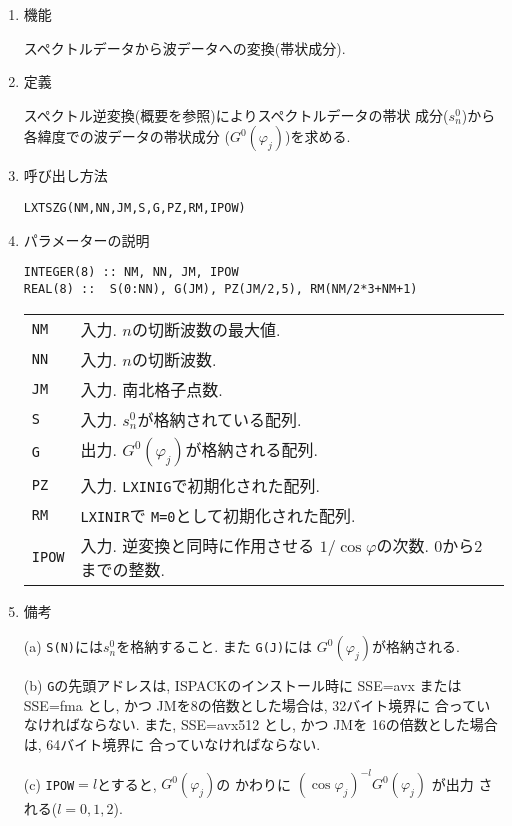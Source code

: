 \documentclass[a4j]{jarticle}
\begin{document}
\begin{enumerate}

\item 機能 

スペクトルデータから波データへの変換(帯状成分).

\item 定義

スペクトル逆変換(概要を参照)によりスペクトルデータの帯状
成分($s^0_n$)から各緯度での波データの帯状成分
($G^0(\varphi_j)$)を求める.

\item 呼び出し方法 

\texttt{LXTSZG(NM,NN,JM,S,G,PZ,RM,IPOW)}
  
\item パラメーターの説明

\begin{verbatim}  
INTEGER(8) :: NM, NN, JM, IPOW
REAL(8) ::  S(0:NN), G(JM), PZ(JM/2,5), RM(NM/2*3+NM+1)
\end{verbatim}  

\begin{tabular}{ll}
\texttt{NM} & 入力. $n$の切断波数の最大値.\\
\texttt{NN} & 入力. $n$の切断波数.\\
\texttt{JM} & 入力. 南北格子点数.\\
\texttt{S} & 入力. $s^0_n$が格納されている配列.\\
\texttt{G} & 出力. $G^0(\varphi_j)$が格納される配列.\\
\texttt{PZ}  & 入力. \texttt{LXINIG}で初期化された配列.\\
\texttt{RM}  & \texttt{LXINIR}で \texttt{M=0}として初期化された配列.\\
\texttt{IPOW} & 入力. 逆変換と同時に作用させる
                      $1/\cos\varphi$の次数. 0から2までの整数.
\end{tabular}

\item 備考

(a) \texttt{S(N)}には$s^0_n$を格納すること. また
\texttt{G(J)}には  $G^0(\varphi_j)$が格納される.

(b) \texttt{G}の先頭アドレスは, 
ISPACKのインストール時に SSE=avx または SSE=fma とし, かつ
JMを8の倍数とした場合は, 32バイト境界に
合っていなければならない.
また, SSE=avx512 とし, かつ
JMを 16の倍数とした場合は, 64バイト境界に
合っていなければならない.

(c) \texttt{IPOW}$=l$とすると, $G^0(\varphi_j)$の
    かわりに $(\cos\varphi_j)^{-l}G^0(\varphi_j)$ が出力
    される($l=0,1,2$).

\end{enumerate}
\end{document}
